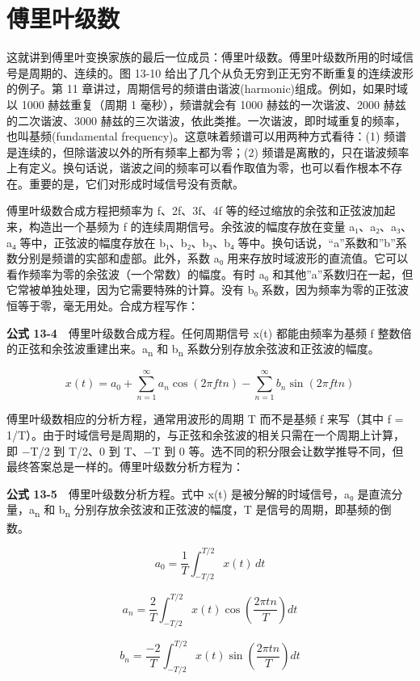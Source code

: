 \section{傅里叶级数}

这就讲到傅里叶变换家族的最后一位成员：傅里叶级数。傅里叶级数所用的时域信号是周期的、连续的。图
13-10 给出了几个从负无穷到正无穷不断重复的连续波形的例子。第 11
章讲过，周期信号的频谱由谐波(harmonic)组成。例如，如果时域以 1000
赫兹重复（周期 1 毫秒），频谱就会有 1000 赫兹的一次谐波、2000
赫兹的二次谐波、3000
赫兹的三次谐波，依此类推。一次谐波，即时域重复的频率，也叫基频(fundamental
frequency)。这意味着频谱可以用两种方式看待：(1)
频谱是连续的，但除谐波以外的所有频率上都为零；(2)
频谱是离散的，只在谐波频率上有定义。换句话说，谐波之间的频率可以看作取值为零，也可以看作根本不存在。重要的是，它们对形成时域信号没有贡献。

傅里叶级数合成方程把频率为 f、2f、3f、4f
等的经过缩放的余弦和正弦波加起来，构造出一个基频为 f
的连续周期信号。余弦波的幅度存放在变量 a₁、a₂、a₃、a₄
等中，正弦波的幅度存放在 b₁、b₂、b₃、b₄
等中。换句话说，``a''系数和''b''系数分别是频谱的实部和虚部。此外，系数
a₀
用来存放时域波形的直流值。它可以看作频率为零的余弦波（一个常数）的幅度。有时
a₀ 和其他''a''系数归在一起，但它常被单独处理，因为它需要特殊的计算。没有
b₀ 系数，因为频率为零的正弦波恒等于零，毫无用处。合成方程写作：

\textbf{公式 13-4}　傅里叶级数合成方程。任何周期信号 x(t)
都能由频率为基频 f 整数倍的正弦和余弦波重建出来。a\textsubscript{n} 和
b\textsubscript{n} 系数分别存放余弦波和正弦波的幅度。

\[x(t) = a_0 + \sum_{n=1}^{\infty} a_n\cos(2\pi f t n) - \sum_{n=1}^{\infty} b_n\sin(2\pi f t n)\]

傅里叶级数相应的分析方程，通常用波形的周期 T 而不是基频 f 来写（其中 f =
1/T）。由于时域信号是周期的，与正弦和余弦波的相关只需在一个周期上计算，即
−T/2 到 T/2、0 到 T、−T 到 0
等。选不同的积分限会让数学推导不同，但最终答案总是一样的。傅里叶级数分析方程为：

\textbf{公式 13-5}　傅里叶级数分析方程。式中 x(t) 是被分解的时域信号，a₀
是直流分量，a\textsubscript{n} 和 b\textsubscript{n}
分别存放余弦波和正弦波的幅度，T 是信号的周期，即基频的倒数。

\[a_0 = \frac{1}{T}\int_{-T/2}^{T/2} x(t)\, dt\]

\[a_n = \frac{2}{T}\int_{-T/2}^{T/2} x(t)\cos\!\left(\frac{2\pi t n}{T}\right) dt\]

\[b_n = \frac{-2}{T}\int_{-T/2}^{T/2} x(t)\sin\!\left(\frac{2\pi t n}{T}\right) dt\]

